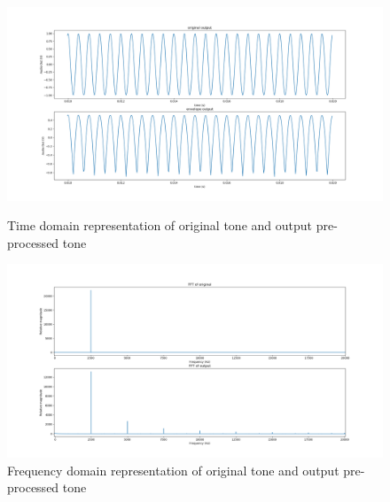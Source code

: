 \begin{figure}[ht!]
\centering

    \begin{minipage}{0.49\textwidth}
    \centering
    \includegraphics[width= \textwidth]{Figures/Implementation/Preprocessing/tdomainPreprocessing.png}
    \caption{Time domain representation of original tone and output pre-processed tone}
    \label{fig:preprocessTdom}
    \end{minipage}\hfill
    \begin{minipage}{0.49\textwidth}
    \centering
    \includegraphics[width= \textwidth]{Figures/Implementation/Preprocessing/FFToutputPreprocessingPos.png}
    \caption{Frequency domain representation of original tone and output pre-processed tone}
    \label{fig:preprocessFdom}
    \end{minipage}
    
\end{figure}



